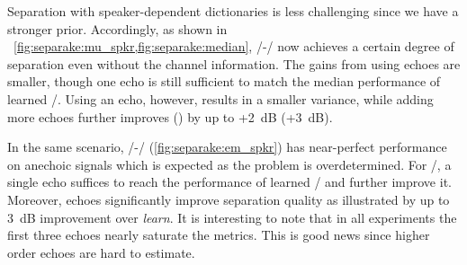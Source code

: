 \mynewline
Separation with speaker-dependent dictionaries is less challenging since we have a stronger prior.
Accordingly, as shown in ~\cref{fig:separake:mu_spkr,fig:separake:median}, \MU/-\NMF/ now achieves a certain degree of separation even without the channel information.
The gains from using echoes are smaller, though one echo is still sufficient to match the median performance of learned \RTFs/.
Using an echo, however, results in a smaller variance, while adding more echoes further improves \SDR{} (\SIR) by up to +2~dB (+3~dB).

\mynewline
In the same scenario, \EM/-\NMF/ (\cref{fig:separake:em_spkr}) has near-perfect performance on anechoic signals which is expected as the problem is overdetermined.
For \MU/, a single echo suffices to reach the performance of learned \RTFs/ and further improve it.
Moreover, echoes significantly improve separation quality as illustrated by up to 3~dB improvement over \textit{learn}.
It is interesting to note that in all experiments the first three echoes nearly saturate the metrics.
This is good news since higher order echoes are hard to estimate.

